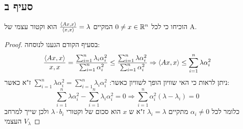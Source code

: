 \documentclass{article}
\begin{document}
	\subsection*{סעיף ב}
	הוכיחו כי לכל $0 \neq x \in \mathbb{R}^n$ המקיים $\frac{\langle Ax, x \rangle}{\langle x,x \rangle} = \lambda$ הוא וקטור עצמי של A.
	\begin{proof}
		בסעיף הקודם הגענו לנוסחה:
		\begin{align*}
			\frac{\langle Ax, x \rangle}{x,x}
			= \frac{\sum_{i=1}^n \lambda_i\alpha_i^2}{\sum_{i=1}^n\alpha_i^2}
			\leq  \frac{\sum_{i=1}^n \lambda\alpha_i^2}{\sum_{i=1}^n\alpha_i^2}
			\Rightarrow \langle Ax, x \rangle \leq \sum_{i=1}^n \lambda\alpha_i^2
		\end{align*}
		ניתן לראות כי האי שוויון הופך לשוויון כאשר: $\sum_{i=1}^n \lambda\alpha_i^2= \sum_{i=1}^n \lambda_i\alpha_i^2$ ז"א כאשר:
		\[
			\sum_{i=1}^n \lambda\alpha_i^2 - \sum_{i=1}^n \lambda_i\alpha_i^2 = 0
			\Rightarrow \sum_{i=1}^n \alpha_i^2(\lambda - \lambda_i) = 0
		\]
		כלומר לכל $\alpha_i \neq 0$ מתקיים $\lambda_i = \lambda$ ז"א ש $x$ הוא סכום של וקטורי $\lambda \cdot b_i$ ולכן שייך למרחב העצמי $V_\lambda$
	\end{proof}
\end{document}
